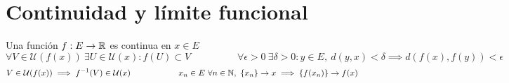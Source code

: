 \section{Continuidad y límite funcional}
Una función $f:E\rightarrow\mathbb{R}$ es continua en $x\in E$
$$ \forall V\in\mathcal{U}(f(x)) \ \exists U\in \mathcal{U}(x) : f(U) \subset V\hspace{2cm}
\forall\epsilon>0 \ \exists\delta>0 : y\in E,\ d(y,x)<\delta \implies d(f(x),f(y))<\epsilon$$
$$V\in\mathcal{U}(f(x)) \implies f^{-1}(V)\in\mathcal{U}(x)  \hspace{2cm}
x_n\in E\ \forall n\in\mathbb{N},\ \{x_n\}\rightarrow x\implies \{f(x_n)\}\rightarrow f(x) $$